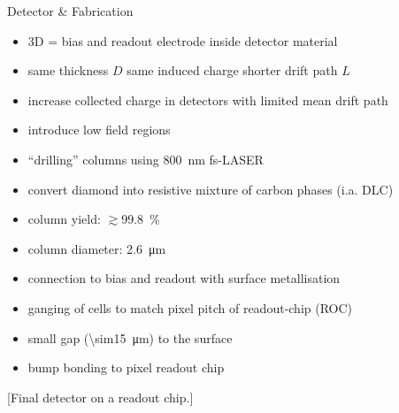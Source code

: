 \begin{block}{Detector \& Fabrication}
	
	
	\begin{itemize}
		\item 3D = bias and readout electrode inside detector material
		\item same thickness $D$ \ra same induced charge \ra shorter drift path $L$
		\item increase collected charge in detectors with limited mean drift path 
		\item introduce low field regions
	\end{itemize}
	
	\begin{itemize}
		\item ``drilling'' columns using \SI{800}{\nano\meter} fs-LASER
		\item convert diamond into resistive mixture of carbon phases (i.a. DLC)%
		\item column yield: $\gtrsim$\SI{99.8}{\%}
		\item column diameter: \SI{2.6}{\micro\meter}
	\end{itemize}
	
	\begin{itemize}
		\item connection to bias and readout with surface metallisation
		\item ganging of cells to match pixel pitch of readout-chip (ROC)
		\item small gap (\SI{\sim15}{\micro\meter}) to the surface
		\item bump bonding to pixel readout chip
	\end{itemize}
	
	\vspace*{2ex}
	[Final detector on a readout chip.]
	
\end{block}
